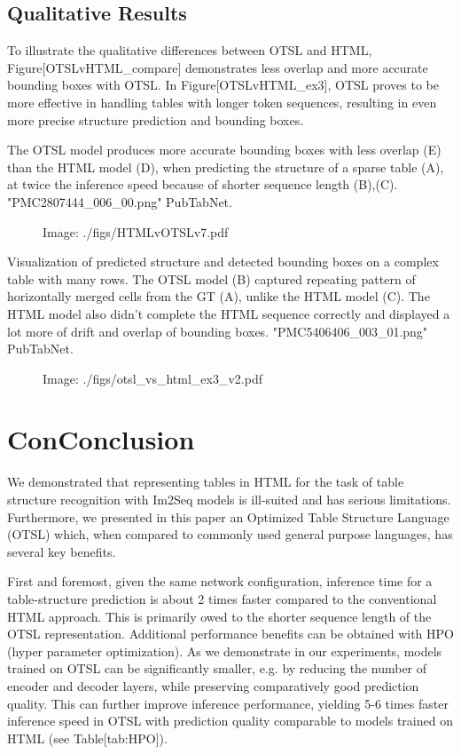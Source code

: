 \documentclass[11pt,a4paper]{article}
\begin{document}
\subsection{Qualitative Results}

To illustrate the qualitative differences between OTSL and HTML, Figure[OTSLvHTML\_compare] demonstrates less overlap and more accurate bounding boxes with OTSL. In Figure[OTSLvHTML\_ex3], OTSL proves to be more effective in handling tables with longer token sequences, resulting in even more precise structure prediction and bounding boxes.

The OTSL model produces more accurate bounding boxes with less overlap (E) than the HTML model (D), when predicting the structure of a sparse table (A), at twice the inference speed because of shorter sequence length (B),(C). "PMC2807444\_006\_00.png" PubTabNet.

\begin{figure}[h]
\caption{Image: ./figs/HTMLvOTSLv7.pdf}
\end{figure}

Visualization of predicted structure and detected bounding boxes on a complex table with many rows. The OTSL model (B) captured repeating pattern of horizontally merged cells from the GT (A), unlike the HTML model (C). The HTML model also didn't complete the HTML sequence correctly and displayed a lot more of drift and overlap of bounding boxes. "PMC5406406\_003\_01.png" PubTabNet.

\begin{figure}[h]
\caption{Image: ./figs/otsl\_vs\_html\_ex3\_v2.pdf}
\end{figure}

\section{ConConclusion}

We demonstrated that representing tables in HTML for the task of table structure recognition with Im2Seq models is ill-suited and has serious limitations. Furthermore, we presented in this paper an Optimized Table Structure Language (OTSL) which, when compared to commonly used general purpose languages, has several key benefits.

First and foremost, given the same network configuration, inference time for a table-structure prediction is about 2 times faster compared to the conventional HTML approach. This is primarily owed to the shorter sequence length of the OTSL representation. Additional performance benefits can be obtained with HPO (hyper parameter optimization). As we demonstrate in our experiments, models trained on OTSL can be significantly smaller, e.g. by reducing the number of encoder and decoder layers, while preserving comparatively good prediction quality. This can further improve inference performance, yielding 5-6 times faster inference speed in OTSL with prediction quality comparable to models trained on HTML (see Table[tab:HPO]).
\end{document}
